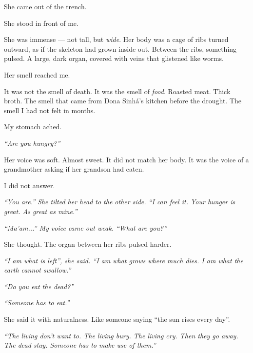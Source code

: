 \noindent She came out of the trench.

\noindent She stood in front of me.

\noindent She was immense --- not tall, but \textit{wide}. Her body was a cage of ribs turned outward, as if the skeleton had grown inside out. Between the ribs, something pulsed. A large, dark organ, covered with veins that glistened like worms.

\noindent Her smell reached me.

\noindent It was not the smell of death. It was the smell of \textit{food}. Roasted meat. Thick broth. The smell that came from Dona Sinhá's kitchen before the drought. The smell I had not felt in months.

\noindent My stomach ached.

\noindent \textit{\textquotedblleft{}Are you hungry?\textquotedblright{}}

\noindent Her voice was soft. Almost sweet. It did not match her body. It was the voice of a grandmother asking if her grandson had eaten.

\noindent I did not answer.

\noindent \textit{\textquotedblleft{}You are.\textquotedblright{}\textit{ She tilted her head to the other side. }\textquotedblleft{}I can feel it. Your hunger is great. As great as mine.\textquotedblright{}}

\noindent \textit{\textquotedblleft{}Ma'am...\textquotedblright{}\textit{ My voice came out weak. }\textquotedblleft{}What are you?\textquotedblright{}}

\noindent She thought. The organ between her ribs pulsed harder.

\noindent \textit{\textquotedblleft{}I am what is left\textquotedblright{}\textit{, she said. }\textquotedblleft{}I am what grows where much dies. I am what the earth cannot swallow.\textquotedblright{}}

\noindent \textit{\textquotedblleft{}Do you eat the dead?\textquotedblright{}}

\noindent \textit{\textquotedblleft{}Someone has to eat.\textquotedblright{}}

\noindent She said it with naturalness. Like someone saying \textquotedblleft{}the sun rises every day\textquotedblright{}.

\noindent \textit{\textquotedblleft{}The living don't want to. The living bury. The living cry. Then they go away. The dead stay. Someone has to make use of them.\textquotedblright{}}

